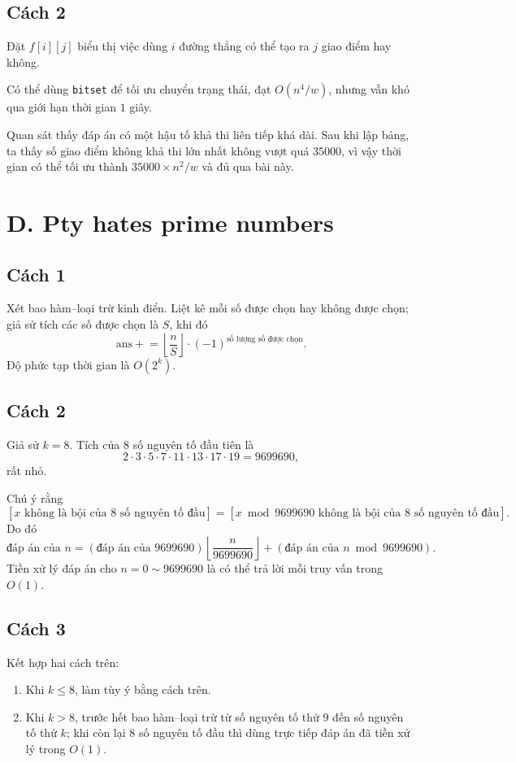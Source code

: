 \documentclass[11pt]{article}
\begin{document}
\subsection*{Cách 2}

Đặt $f[i][j]$ biểu thị việc dùng $i$ đường thẳng có thể tạo ra $j$ giao điểm
hay không.

Có thể dùng \texttt{bitset} để tối ưu chuyển trạng thái, đạt
$O(n^4/w)$, nhưng vẫn khó qua giới hạn thời gian $1$ giây.

Quan sát thấy đáp án có một hậu tố khả thi liên tiếp khá dài. Sau khi lập
bảng, ta thấy số giao điểm không khả thi lớn nhất không vượt quá $35000$, vì
vậy thời gian có thể tối ưu thành $35000\times n^2/w$ và đủ qua bài này.

\section{D. Pty hates prime numbers}

\subsection*{Cách 1}

Xét bao hàm--loại trừ kinh điển. Liệt kê mỗi số được chọn hay không được
chọn; giả sử tích các số được chọn là $S$, khi đó
\[
  \mathrm{ans} \mathrel{+}= \left\lfloor\frac{n}{S}\right\rfloor
  \cdot (-1)^{\text{số lượng số được chọn}}.
\]
Độ phức tạp thời gian là $O(2^k)$.

\subsection*{Cách 2}

Giả sử $k=8$. Tích của $8$ số nguyên tố đầu tiên là
\[
  2\cdot 3\cdot 5\cdot 7\cdot 11\cdot 13\cdot 17\cdot 19
  =9699690,
\]
rất nhỏ.

Chú ý rằng
\[
  [x\text{ không là bội của }8\text{ số nguyên tố đầu}]
  =
  [x\bmod 9699690\text{ không là bội của }8\text{ số nguyên tố đầu}].
\]
Do đó
\[
  \text{đáp án của }n
  =
  (\text{đáp án của }9699690)
  \left\lfloor\frac{n}{9699690}\right\rfloor
  +(\text{đáp án của }n\bmod 9699690).
\]
Tiền xử lý đáp án cho $n=0\sim 9699690$ là có thể trả lời mỗi truy vấn trong
$O(1)$.

\subsection*{Cách 3}

Kết hợp hai cách trên:
\begin{enumerate}
  \item Khi $k\le 8$, làm tùy ý bằng cách trên.
  \item Khi $k>8$, trước hết bao hàm--loại trừ từ số nguyên tố thứ $9$ đến
  số nguyên tố thứ $k$; khi còn lại $8$ số nguyên tố đầu thì dùng trực tiếp
  đáp án đã tiền xử lý trong $O(1)$.
\end{enumerate}
\end{document}

